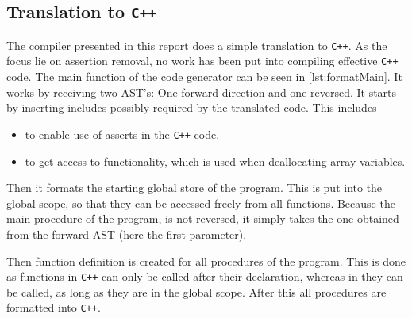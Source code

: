 \subsection{Translation to \texttt{C++} }
The \lan compiler presented in this report does a simple translation to \texttt{C++}.
As the focus lie on assertion removal, no work has been put into compiling effective
\texttt{C++} code. The main function of the code generator can be seen in
\autoref{lst:formatMain}. It works by receiving two AST's: One forward direction and one reversed.
It starts by inserting includes possibly required by the translated code. This includes

\begin{itemize}
      \item {} to enable use of asserts in the \texttt{C++} code.

      \item {} to get access to  functionality, which is used
            when deallocating array variables.
\end{itemize}
\noindent
Then it formats the starting global store of the \lan program. This is put into the global
scope, so that they can be accessed freely from all functions. Because the main procedure of
the \lan program, is not reversed, it simply takes the one obtained from the forward AST
(here the first parameter).

Then function definition is created for all procedures of the program. This is done as
functions in \texttt{C++} can only be called after their declaration, whereas in \lan
they can be called, as long as they are in the global scope.
After this all procedures are formatted into \texttt{C++}.

